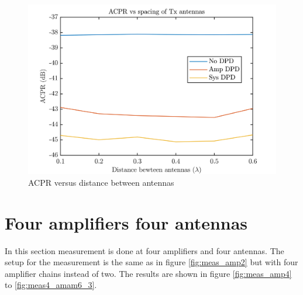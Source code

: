 \begin{figure}[H]
\centering 
\includegraphics[scale = 0.6]{figures/measurement/cree/meas3/acpr_two_ant.png}
\caption{ACPR versus distance between antennas}
\label{fig:meas2_dpd}
\end{figure}


\section{Four amplifiers four antennas}

In this section measurement is done at four amplifiers and four antennas. The setup for the measurement is the same as in figure \ref{fig:meas_amp2} but with four amplifier chains instead of two. The results are shown in figure \ref{fig:meas_amp4} to \ref{fig:meas4_amam6_3}.


